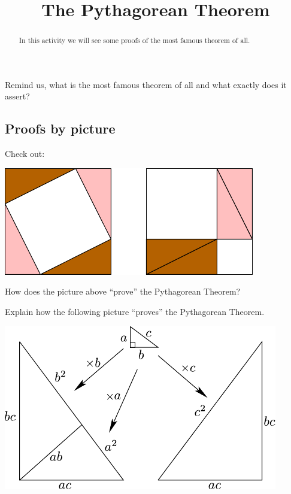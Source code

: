 \documentclass{ximera}
\title{The Pythagorean Theorem}
\begin{document}
\begin{abstract}
In this activity we will see some proofs of the most famous theorem of
  all.
\end{abstract}
\maketitle



\begin{question}
Remind us, what is the most famous theorem of all and what exactly
does it assert?
\end{question}




\subsection*{Proofs by picture}



\begin{question}
Check out:
\begin{image}
\includegraphics{pbppyth1.pdf}
\end{image}
How does the picture above ``prove'' the Pythagorean Theorem?
\end{question}


\begin{question}
Explain how the following picture ``proves'' the Pythagorean Theorem.
\begin{image}
\includegraphics{pbpdilation.pdf}
\end{image}
\end{question}
\end{document}
